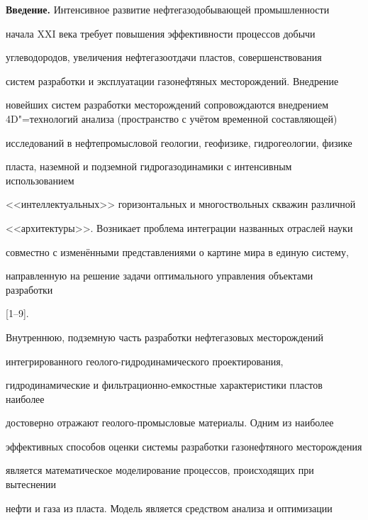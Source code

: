 


\maketitle



\textbf{Введение.} Интенсивное развитие нефтегазодобывающей промышленности

начала XXI века требует повышения эффективности процессов добычи

углеводородов, увеличения нефтегазоотдачи пластов, совершенствования

систем разработки и эксплуатации газонефтяных месторождений. Внедрение

новейших систем разработки месторождений сопровождаются внедрением 4D"=технологий анализа (пространство с учётом временной составляющей)

исследований в нефтепромысловой геологии, геофизике, гидрогеологии, физике

пласта, наземной и подземной гидрогазодинамики с интенсивным использованием

<<интеллектуальных>> горизонтальных и многоствольных скважин различной

<<архитектуры>>. Возникает проблема интеграции названных отраслей науки

совместно с изменёнными представлениями о картине мира в единую систему,

направленную на решение задачи оптимального управления объектами разработки

[1--9].



Внутреннюю, подземную часть разработки нефтегазовых месторождений

интегрированного геолого-гидродинамического проектирования,

гидродинамические и фильтрационно-емкостные характеристики пластов наиболее

достоверно отражают геолого-промысловые материалы. Одним из наиболее

эффективных способов оценки системы разработки газонефтяного месторождения

является математическое моделирование процессов, происходящих при вытеснении

нефти и газа из пласта. Модель является средством анализа и оптимизации

